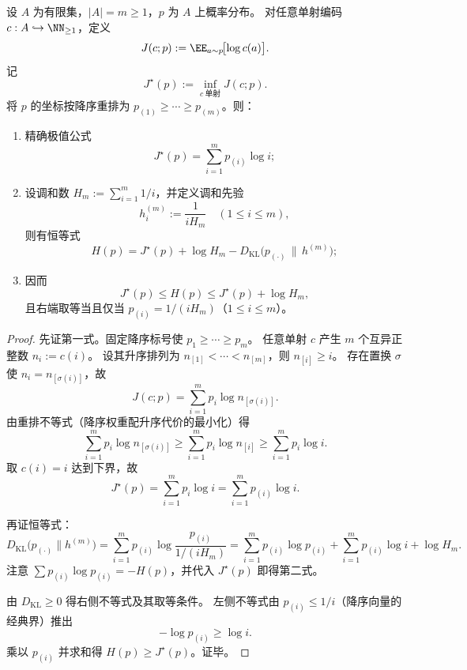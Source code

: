 \begin{theorem}[纤维内最小哥德尔代价与调和 KL 分解]\label{thm:conclusion-fiber-minimal-godel-cost-harmonic-kl}
设 \(A\) 为有限集，\(|A|=m\ge 1\)，\(p\) 为 \(A\) 上概率分布。
对任意单射编码 \(c:A\hookrightarrow \NN_{\ge 1}\)，定义
\[
J(c;p):=\EE_{a\sim p}\!\bigl[\log c(a)\bigr].
\]
记
\[
J^\star(p):=\inf_{c\ \mathrm{单射}}J(c;p).
\]
将 \(p\) 的坐标按降序重排为 \(p_{(1)}\ge\cdots\ge p_{(m)}\)。则：
\begin{enumerate}
  \item 精确极值公式
  \[
  J^\star(p)=\sum_{i=1}^{m}p_{(i)}\log i;
  \]
  \item 设调和数 \(H_m:=\sum_{i=1}^{m}1/i\)，并定义调和先验
  \[
  h^{(m)}_i:=\frac{1}{iH_m}\quad(1\le i\le m),
  \]
  则有恒等式
  \[
  H(p)=J^\star(p)+\log H_m-D_{\mathrm{KL}}\!\bigl(p_{(\cdot)}\,\|\,h^{(m)}\bigr);
  \]
  \item 因而
  \[
  J^\star(p)\le H(p)\le J^\star(p)+\log H_m,
  \]
  且右端取等当且仅当 \(p_{(i)}=1/(iH_m)\)（\(1\le i\le m\)）。
\end{enumerate}
\end{theorem}
\begin{proof}
先证第一式。固定降序标号使 \(p_1\ge\cdots\ge p_m\)。
任意单射 \(c\) 产生 \(m\) 个互异正整数 \(n_i:=c(i)\)。
设其升序排列为 \(n_{[1]}<\cdots<n_{[m]}\)，则 \(n_{[i]}\ge i\)。
存在置换 \(\sigma\) 使 \(n_i=n_{[\sigma(i)]}\)，故
\[
J(c;p)=\sum_{i=1}^{m}p_i\log n_{[\sigma(i)]}.
\]
由重排不等式（降序权重配升序代价的最小化）得
\[
\sum_{i=1}^{m}p_i\log n_{[\sigma(i)]}\ge \sum_{i=1}^{m}p_i\log n_{[i]}
\ge \sum_{i=1}^{m}p_i\log i.
\]
取 \(c(i)=i\) 达到下界，故
\[
J^\star(p)=\sum_{i=1}^{m}p_i\log i=\sum_{i=1}^{m}p_{(i)}\log i.
\]

再证恒等式：
\[
D_{\mathrm{KL}}\!\bigl(p_{(\cdot)}\|h^{(m)}\bigr)
=\sum_{i=1}^{m}p_{(i)}\log\frac{p_{(i)}}{1/(iH_m)}
=\sum_{i=1}^{m}p_{(i)}\log p_{(i)}+\sum_{i=1}^{m}p_{(i)}\log i+\log H_m.
\]
注意 \(\sum p_{(i)}\log p_{(i)}=-H(p)\)，并代入 \(J^\star(p)\) 即得第二式。

由 \(D_{\mathrm{KL}}\ge 0\) 得右侧不等式及其取等条件。
左侧不等式由 \(p_{(i)}\le 1/i\)（降序向量的经典界）推出
\[
-\log p_{(i)}\ge \log i.
\]
乘以 \(p_{(i)}\) 并求和得 \(H(p)\ge J^\star(p)\)。证毕。
\end{proof}

